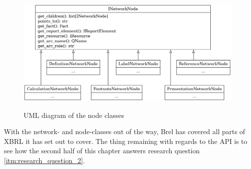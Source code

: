 \begin{figure}[H]
    \centering
    \caption{UML diagram of the node classes}
    \includegraphics[width=\textwidth]{images/brel_network_node_classes.png}
    \label{fig:brel_network_node_classes}
\end{figure}

With the network- and node-classes out of the way, Brel has covered all parts of XBRL it has set out to cover.
The thing remaining with regards to the API is to see how the second half of this chapter answers research question \ref{itm:research_question_2}.

